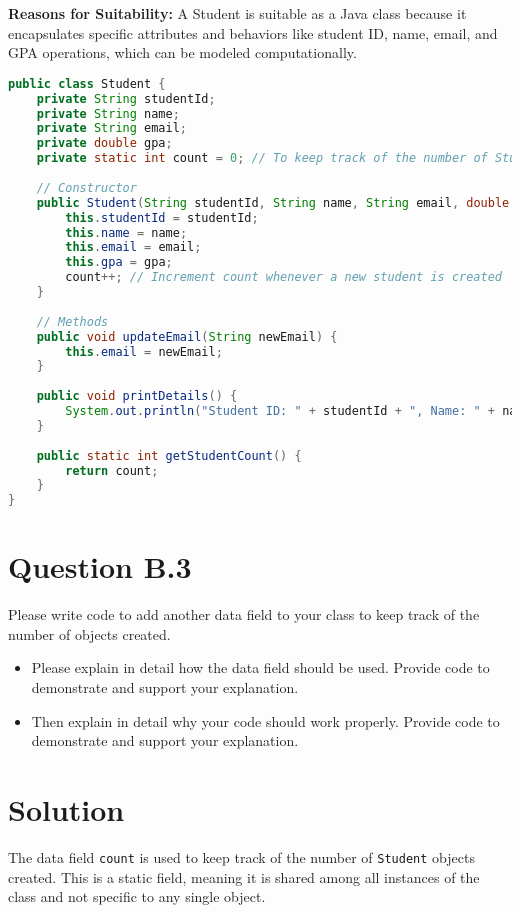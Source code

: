 \documentclass[12pt]{article}
\begin{document}
\textbf{Reasons for Suitability:}
A Student is suitable as a Java class because it encapsulates specific attributes and behaviors like student ID, name, email, and GPA operations, which can be modeled computationally.

\begin{lstlisting}[language=Java]
public class Student {
    private String studentId;
    private String name;
    private String email;
    private double gpa;
    private static int count = 0; // To keep track of the number of Student objects created
    
    // Constructor
    public Student(String studentId, String name, String email, double gpa) {
        this.studentId = studentId;
        this.name = name;
        this.email = email;
        this.gpa = gpa;
        count++; // Increment count whenever a new student is created
    }
    
    // Methods
    public void updateEmail(String newEmail) {
        this.email = newEmail;
    }
    
    public void printDetails() {
        System.out.println("Student ID: " + studentId + ", Name: " + name + ", Email: " + email + ", GPA: " + gpa);
    }
    
    public static int getStudentCount() {
        return count;
    }
}
\end{lstlisting}

\newpage

\section*{Question B.3}
Please write code to add another data field to your class to keep track of the number of objects created.
\begin{itemize}
  \item Please explain in detail how the data field should be used. Provide code to demonstrate and support your explanation.
  \item Then explain in detail why your code should work properly. Provide code to demonstrate and support your explanation.
\end{itemize}

\section*{Solution}
The data field \texttt{count} is used to keep track of the number of \texttt{Student} objects created. This is a static field, meaning it is shared among all instances of the class and not specific to any single object.
\end{document}
